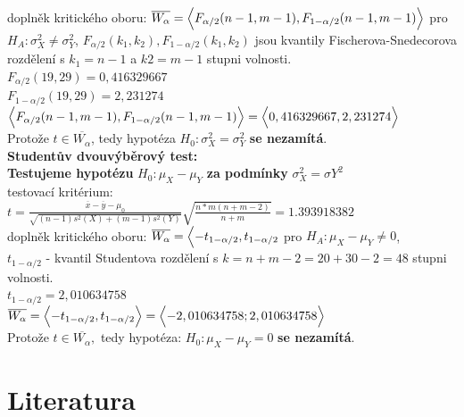 \documentclass[11pt,a4paper]{article}
\begin{document}
doplněk kritického oboru: $ \overline{W_\alpha} = \Bigl< F_{\alpha/2} (n - 1, m - 1), F_{1-\alpha/2} (n - 1, m - 1) \Bigr> $ pro $ H_A : \sigma_{X}^2 \ne \sigma_{Y}^2$, $F_{\alpha/2}(k_1, k_2), F_{1-\alpha/2}(k_{1}, k_2) $ jsou kvantily Fischerova-Snedecorova rozdělení s $ k_1 = n - 1 $ a $ k2 = m - 1 $ stupni volnosti. \\

$ F_{\alpha/2}(19, 29) = 0,416329667 $ \\

$ F_{1-\alpha/2}(19, 29) = 2,231274 $ \\

$ \Bigl< F_{\alpha/2} (n - 1, m - 1), F_{1-\alpha/2} (n - 1, m - 1) \Bigr> = \Bigl< 0,416329667, 2,231274 \Bigr> $ \\

Protože $ t \in \overline{W_\alpha}$, tedy hypotéza $ H_0 : \sigma_{X}^2 = \sigma_{Y}^2$ \textbf{se nezamítá}. \\

\vspace{0,7cm}
\textbf{Studentův dvouvýběrový test:} \\
 
\textbf{Testujeme hypotézu} $ H_0 : \mu_X - \mu_Y $ \textbf{za podmínky} $ \sigma_{X}^2 = \sigma{Y}^2 $\\

testovací kritérium: $ t = \frac{\overline{x} - \overline{y} - \mu_0}{\sqrt{(n - 1) s^2(X) + (m - 1) s^2(Y)} } \sqrt{ \frac{n * m(n + m - 2)}{n + m} } = 1.393918382 $ \\

doplněk kritického oboru: $ \overline{W_\alpha} = \Bigl< -t_{1-\alpha/2}, t_{1-\alpha/2} $ pro $ H_A : \mu_X - \mu_Y \ne 0 $, \\

$ t_{1-\alpha/2} $ - kvantil Studentova rozdělení s $ k = n + m - 2 = 20 + 30 - 2 = 48 $ stupni volnosti. \\

$ t_{1-\alpha/2} = 2,010634758 $ \\

$ \overline{W_\alpha} = \Bigl< -t_{1-\alpha/2}, t_{1-\alpha/2} \Bigr> = \Bigl< -2,010634758; 2,010634758 \Bigr> $ \\

Protože $ t \in \overline{W_\alpha} ,$ tedy hypotéza: $ H_0 : \mu_X - \mu_Y = 0 $ \textbf{se nezamítá}.

\newpage

\section{Literatura}

\begin{flushleft}
    
\end{flushleft}
\end{document}
